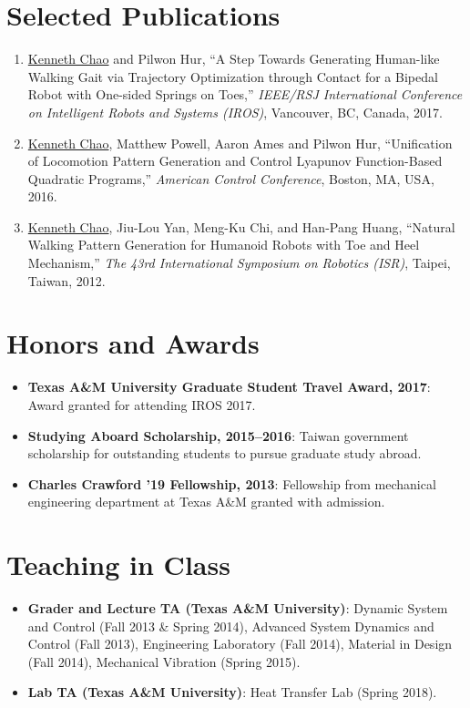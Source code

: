\documentclass[letterpaper,11pt]{article}
\newcommand{\resumeItem}[2]{
  \item\small{
    \textbf{#1}{: #2 \vspace{-2pt}}
  }
}
\newcommand{\resumeNumItem}[1]{
  \item\small{
    {#1 \vspace{-2pt}}
  }
}
\newcommand{\resumeSubItem}[2]{\resumeItem{#1}{#2}\vspace{-4pt}}
\newcommand{\resumeSubHeadingListStart}{\begin{itemize}[leftmargin=*]}
\newcommand{\resumeSubHeadingListEnd}{\end{itemize}}
\newcommand{\resumeNumItemListStart}{\begin{enumerate}}
\newcommand{\resumeNumItemListEnd}{\end{enumerate}\vspace{-5pt}}
\begin{document}
\section{Selected Publications}
  \resumeNumItemListStart
\resumeNumItem
{\underline{Kenneth Chao} and Pilwon Hur, ``A Step Towards Generating Human-like Walking Gait via Trajectory Optimization through Contact for a Bipedal Robot with One-sided Springs on Toes,''  \textit{IEEE/RSJ International Conference on Intelligent Robots and Systems (IROS)}, Vancouver, BC, Canada, 2017.}  
  
\resumeNumItem
{\underline{Kenneth Chao}, Matthew Powell, Aaron Ames and Pilwon Hur, ``Unification of Locomotion Pattern Generation and Control Lyapunov Function-Based Quadratic Programs,''
             	\textit{American Control Conference},
             	Boston, MA, USA, 2016.}
\resumeNumItem
{\underline{Kenneth Chao}, Jiu-Lou Yan, Meng-Ku Chi, and Han-Pang Huang,
	``Natural Walking Pattern Generation for Humanoid Robots with Toe and Heel Mechanism,''
	\textit{The 43rd International Symposium on Robotics (ISR)},
	Taipei, Taiwan,
2012.}
%    	
  \resumeNumItemListEnd


\section{Honors and Awards}
  \resumeSubHeadingListStart
        \resumeSubItem{Texas A\&M University Graduate Student Travel Award, 2017}
        {Award granted for attending IROS 2017.}     
      \resumeSubItem{Studying Aboard Scholarship, 2015--2016}
      {Taiwan government scholarship for outstanding students to pursue graduate study abroad.}
      \resumeSubItem{Charles Crawford '19 Fellowship, 2013}
      {Fellowship from mechanical engineering department at Texas A\&M granted with admission.}
  \resumeSubHeadingListEnd
\section{Teaching in Class}
  \resumeSubHeadingListStart
      \resumeSubItem{Grader and Lecture TA (Texas A\&M University)}
      {Dynamic System and Control (Fall 2013 \& Spring 2014), Advanced System Dynamics and Control (Fall 2013), Engineering Laboratory (Fall 2014), Material in Design (Fall 2014), Mechanical Vibration (Spring 2015).}
      \resumeSubItem{Lab TA (Texas A\&M University)}
      {Heat Transfer Lab (Spring 2018).}      
  \resumeSubHeadingListEnd
\end{document}
